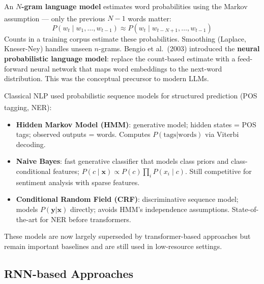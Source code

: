 \begin{tcbitemize}[ skin=sectionraster ]
    \tcbitem[title={N-gram Language Models}, raster multicolumn=3]
    An \textbf{$N$-gram language model} estimates word probabilities using the Markov assumption --- only the previous $N-1$ words matter\textsuperscript{\cite[][]{bengioNeuralProbabilisticLanguage}}:
    \begin{equation}
        P(w_t \mid w_1, \ldots, w_{t-1})
        \approx
        P(w_t \mid w_{t-N+1}, \ldots, w_{t-1})
    \end{equation}
    Counts in a training corpus estimate these probabilities.
    Smoothing (Laplace, Kneser-Ney) handles unseen $n$-grams.
    Bengio et al.\ (2003) introduced the \textbf{neural probabilistic language model}: replace the count-based estimate with a feed-forward neural network that maps word embeddings to the next-word distribution.
    This was the conceptual precursor to modern LLMs.

    \tcbitem[title={Sequence Models: HMM and CRF}, raster multicolumn=3]
    Classical NLP used probabilistic sequence models for structured prediction (POS tagging, NER)\textsuperscript{\cite[][p.~6]{dhamaniIntroductionGenerativeAI2024}}:
    \begin{itemize}
        \item \textbf{Hidden Markov Model (HMM)}: generative model; hidden states = POS tags; observed outputs = words.
              Computes $P(\text{tags}|\text{words})$ via Viterbi decoding.
        \item \textbf{Naive Bayes}: fast generative classifier that models class priors and class-conditional features;
              $P(c \mid \mathbf{x}) \propto P(c) \prod_i P(x_i \mid c)$.
              Still competitive for sentiment analysis with sparse features.
        \item \textbf{Conditional Random Field (CRF)}: discriminative sequence model; models $P(\mathbf{y}|\mathbf{x})$ directly; avoids HMM's independence assumptions.
              State-of-the-art for NER before transformers.
    \end{itemize}
    These models are now largely superseded by transformer-based approaches but remain important baselines and are still used in low-resource settings.
\end{tcbitemize}

\subsection{RNN-based Approaches}

